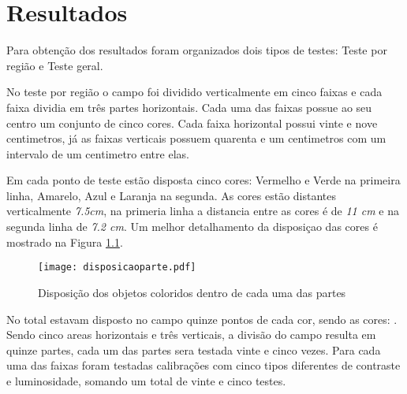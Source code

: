 \chapter{Resultados} 

Para obtenção dos resultados foram organizados dois tipos de testes: Teste por região e
Teste geral.

No teste por região o campo foi dividido verticalmente em cinco faixas e cada faixa dividia em três partes horizontais. Cada uma das faixas possue ao seu centro um conjunto de cinco cores.
Cada faixa horizontal possui vinte e nove centimetros, já as faixas verticais possuem quarenta e um centimetros com um intervalo de um centimetro entre elas.

Em cada ponto de teste estão disposta cinco cores: Vermelho  e Verde na primeira linha, Amarelo, Azul e Laranja na segunda. As cores estão distantes verticalmente \textit{7.5cm}, na primeria linha a distancia entre as cores é  de \textit{11 cm} e na segunda linha de \textit{7.2 cm}. Um  melhor detalhamento da disposiçao das cores é  mostrado na Figura \ref{disposicaoparte}.

\begin{figure}[!: h]
		\centering
		\texttt{[image: disposicaoparte.pdf]}
		\caption{Disposição dos objetos coloridos dentro de cada uma das partes}
		\label{disposicaoparte}
	\end{figure}
	
No total estavam disposto no campo quinze pontos de cada cor, sendo as cores: . Sendo cinco areas horizontais e três verticais, a divisão do campo resulta em quinze partes, cada um das partes sera testada vinte e cinco vezes.
 Para cada uma das faixas foram testadas calibrações com cinco tipos diferentes de contraste e luminosidade, somando um total de vinte e cinco testes.	
	
